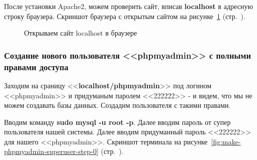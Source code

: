 После установки Apache2, можем проверить сайт, вписав \textbf{localhost} в адресную строку браузера. Скриншот браузера с открытым сайтом на рисунке~\ref{fig:sudo-apt-install-apache2-step-7} (стр.~\pageref{fig:sudo-apt-install-apache2-step-7}).

\begin{figure}[!htp]
    \caption{Открываем сайт localhost в браузере}
    \label{fig:sudo-apt-install-apache2-step-7}
\end{figure}

\newpage



\subsubsection{Создание нового пользователя <<phpmyadmin>> с полными правами доступа}

Заходим на сраницу <<\textbf{localhost/phpmyadmin}>> под логином <<phpmyadmin>> и придуманым паролем <<222222>> - и видем, что мы не можем создавать базы данных. Создадим пользователя с такими правами.

Вводим команду \textbf{sudo mysql -u root -p}. Далее вводим пароль от супер пользователя нашей системы. Далее вводим придуманный пароль <<222222>> для нашего <<phpmyadmin>>. Скриншот терминала на рисунке~\ref{fig:make-phpmyadmin-superuser-step-0} (стр.~\pageref{fig:make-phpmyadmin-superuser-step-0}).

